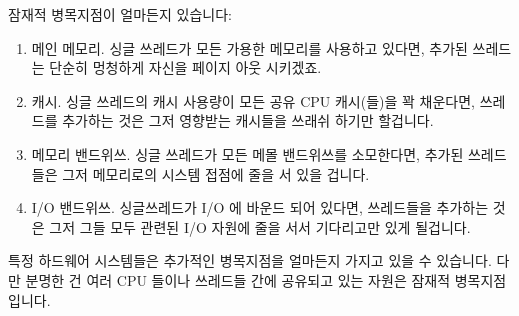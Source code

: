 \QuickA{}
	잠재적 병목지점이 얼마든지 있습니다:

	\begin{enumerate}
	\item	메인 메모리. 싱글 쓰레드가 모든 가용한 메모리를 사용하고
		있다면, 추가된 쓰레드는 단순히 멍청하게 자신을 페이지 아웃
		시키겠죠.
	\item	캐시. 싱글 쓰레드의 캐시 사용량이 모든 공유 CPU 캐시(들)을 꽉
		채운다면, 쓰레드를 추가하는 것은 그저 영향받는 캐시들을 쓰래쉬
		하기만 할겁니다.
	\item	메모리 밴드위쓰. 싱글 쓰레드가 모든 메몰 밴드위쓰를 소모한다면,
		추가된 쓰레드들은 그저 메모리로의 시스템 접점에 줄을 서 있을
		겁니다.
	\item	I/O 밴드위쓰. 싱글쓰레드가 I/O 에 바운드 되어 있다면,
		쓰레드들을 추가하는 것은 그저 그들 모두 관련된 I/O 자원에 줄을
		서서 기다리고만 있게 될겁니다.

	\end{enumerate}

	특정 하드웨어 시스템들은 추가적인 병목지점을 얼마든지 가지고 있을 수
	있습니다.
	다만 분명한 건 여러 CPU 들이나 쓰레드들 간에 공유되고 있는 자원은
	잠재적 병목지점입니다.

